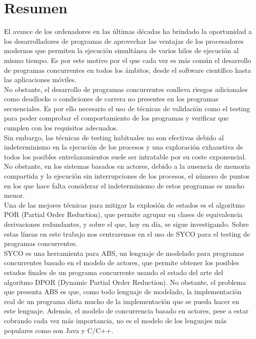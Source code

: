 \chapter*{Resumen}
\thispagestyle{empty}
El avance de los ordenadores en las últimas décadas ha brindado la oportunidad a los desarrolladores de programas de aprovechar las ventajas de los procesadores modernos que permiten la ejecución simultánea de varios hilos de ejecución al mismo tiempo. Es por este motivo por el que cada vez es más común el desarrollo de programas concurrentes en todos los ámbitos, desde el software científico hasta las aplicaciones móviles.\\

No obstante, el desarrollo de programas concurrentes conlleva riesgos adicionales como deadlocks o condiciones de carrera no presentes en los programas secuenciales. Es por ello necesario el uso de técnicas de validación como el testing para poder comprobar el comportamiento de los programas y verificar que cumplen con los requisitos adecuados.\\

Sin embargo, las técnicas de testing habituales no son efectivas debido al indeterminismo en la ejecución de los procesos y una exploración exhaustiva de todos los posibles entrelazamientos suele ser intratable por su coste exponencial. No obstante, en los sistemas basados en actores, debido a la ausencia de memoria compartida y la ejecución sin interrupciones de los procesos, el número de puntos en los que hace falta considerar el indeterminismo de estos programas es mucho menor.\\

Una de las mejores técnicas para mitigar la explosión de estados es el algoritmo POR (Partial Order Reduction), que permite agrupar en clases de equivalencia derivaciones redundantes, y sobre el que, hoy en día, se sigue investigando. Sobre estas líneas en este trabajo nos centraremos en el uso de SYCO para el testing de programas concurrentes.\\

SYCO es una herramienta para ABS, un lenguaje de modelado para programas concurrentes basado en el modelo de actores, que permite obtener los posibles estados finales de un programa concurrente usando el estado del arte del algoritmo DPOR (Dynamic Partial Order Reduction). No obstante, el problema que presenta ABS es que, como todo lenguaje de modelado, la implementación real de un programa dista mucho de la implementación que se pueda hacer en este lenguaje. Además, el modelo de concurrencia basado en actores, pese a estar cobrando cada vez más importancia, no es el modelo de los lenguajes más populares como son Java y C/C++.\\

